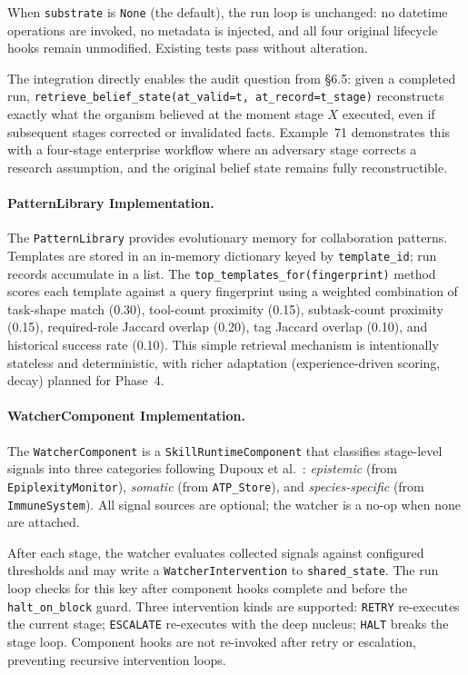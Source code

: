 When \texttt{substrate} is \texttt{None} (the default), the run loop is unchanged: no datetime operations are invoked, no metadata is injected, and all four original lifecycle hooks remain unmodified. Existing tests pass without alteration.

The integration directly enables the audit question from \S6.5: given a completed run, \texttt{retrieve\_belief\_state(at\_valid=t, at\_record=t\_stage)} reconstructs exactly what the organism believed at the moment stage $X$ executed, even if subsequent stages corrected or invalidated facts. Example~71 demonstrates this with a four-stage enterprise workflow where an adversary stage corrects a research assumption, and the original belief state remains fully reconstructible.

\paragraph{PatternLibrary Implementation.}
\label{sec:pattern-library-impl}
The \texttt{PatternLibrary} provides evolutionary memory for collaboration patterns. Templates are stored in an in-memory dictionary keyed by \texttt{template\_id}; run records accumulate in a list. The \texttt{top\_templates\_for(fingerprint)} method scores each template against a query fingerprint using a weighted combination of task-shape match (0.30), tool-count proximity (0.15), subtask-count proximity (0.15), required-role Jaccard overlap (0.20), tag Jaccard overlap (0.10), and historical success rate (0.10). This simple retrieval mechanism is intentionally stateless and deterministic, with richer adaptation (experience-driven scoring, decay) planned for Phase~4.

\paragraph{WatcherComponent Implementation.}
\label{sec:watcher-impl}
The \texttt{WatcherComponent} is a \texttt{SkillRuntimeComponent} that classifies stage-level signals into three categories following Dupoux et al.~\cite{dupoux2026learning}: \emph{epistemic} (from \texttt{EpiplexityMonitor}), \emph{somatic} (from \texttt{ATP\_Store}), and \emph{species-specific} (from \texttt{ImmuneSystem}). All signal sources are optional; the watcher is a no-op when none are attached.

After each stage, the watcher evaluates collected signals against configured thresholds and may write a \texttt{WatcherIntervention} to \texttt{shared\_state}. The run loop checks for this key after component hooks complete and before the \texttt{halt\_on\_block} guard. Three intervention kinds are supported: \texttt{RETRY} re-executes the current stage; \texttt{ESCALATE} re-executes with the deep nucleus; \texttt{HALT} breaks the stage loop. Component hooks are not re-invoked after retry or escalation, preventing recursive intervention loops.

